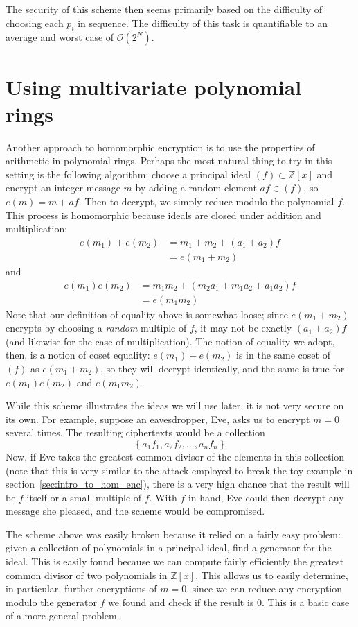 \documentclass[11pt]{report}
\newcommand{\Zx}{\mathbb{Z}[x]}
\newcommand{\bigO}{\mathcal{O}}
\begin{document}
The security of this scheme then seems primarily based on the difficulty of choosing each $p_i$ in sequence. The difficulty of this task is quantifiable to an average and worst case of $\bigO(2^{N})$.

\section{Using multivariate polynomial rings}
\label{sec:multicrypt}

Another approach to homomorphic encryption is to use the properties of arithmetic in polynomial rings. Perhaps the most natural thing to try in this setting is the following algorithm: choose a principal ideal $(f)\subset \Zx$ and encrypt an integer message $m$ by adding a random element $af\in (f)$, so $e(m) = m+af$. Then to decrypt, we simply reduce modulo the polynomial $f$. This process is homomorphic because ideals are closed under addition and multiplication:
\begin{align*}
e(m_1)+e(m_2) &= m_1+m_2+(a_1+a_2)f\\
&= e(m_1+m_2)
\end{align*}
and
\begin{align*}
e(m_1)e(m_2) &= m_1m_2+(m_2a_1+m_1a_2+a_1a_2)f\\
&= e(m_1m_2)
\end{align*}
Note that our definition of equality above is somewhat loose; since $e(m_1+m_2)$ encrypts by choosing a \emph{random} multiple of $f$, it may not be exactly $(a_1+a_2)f$ (and likewise for the case of multiplication). The notion of equality we adopt, then, is a notion of coset equality: $e(m_1)+e(m_2)$ is in the same coset of $(f)$ as $e(m_1+m_2)$, so they will decrypt identically, and the same is true for $e(m_1)e(m_2)$ and $e(m_1m_2)$.

While this scheme illustrates the ideas we will use later, it is not very secure on its own. For example, suppose an eavesdropper, Eve, asks us to encrypt $m=0$ several times. The resulting ciphertexts would be a collection
\[\left\{ a_1f_1, a_2f_2,\dots ,a_nf_n\right\}\]
Now, if Eve takes the greatest common divisor of the elements in this collection (note that this is very similar to the attack employed to break the toy example in section~\ref{sec:intro_to_hom_enc}), there is a very high chance that the result will be $f$ itself or a small multiple of $f$. With $f$ in hand, Eve could then decrypt any message she pleased, and the scheme would be compromised.

The scheme above was easily broken because it relied on a fairly easy problem: given a collection of polynomials in a principal ideal, find a generator for the ideal. This is easily found because we can compute fairly efficiently the greatest common divisor of two polynomials in $\Zx$. This allows us to easily determine, in particular, further encryptions of $m=0$, since we can reduce any encryption modulo the generator $f$ we found and check if the result is $0$. This is a basic case of a more general problem. 
\end{document}
